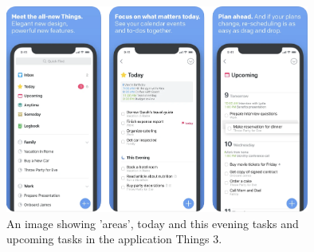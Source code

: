 \begin{figure}[htb]

	\centering
	\includegraphics[width=10cm]{./graphics/things3.png}
	\caption{An image showing 'areas', today and this evening tasks and upcoming tasks in the application Things 3\cite{things_3}.}
	\label{fig:things3}
	
\end{figure}